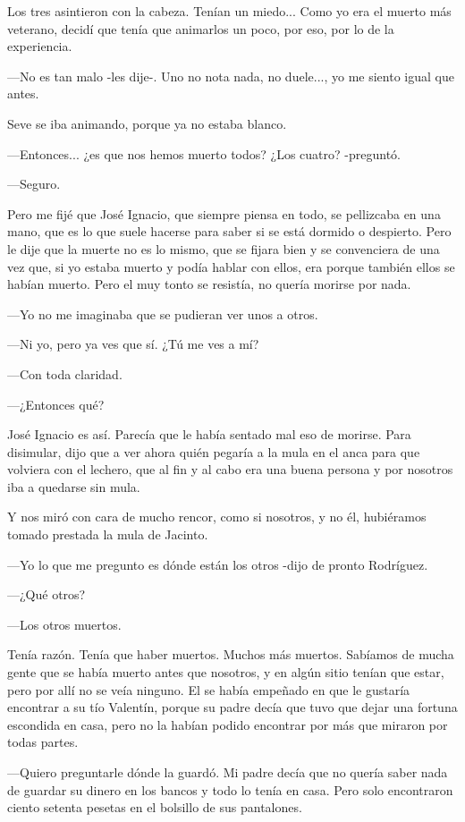 \documentclass{barcodevapor3pags}
\begin{document}
Los tres asintieron con la cabeza. Tenían un miedo... Como yo era el
muerto más veterano, decidí que tenía que animarlos un poco, por eso,
por lo de la experiencia.~

---No es tan malo -les dije-. Uno no nota nada, no duele..., yo me
siento igual que antes.~

Seve se iba animando, porque ya no estaba blanco.~

---Entonces... ¿es que nos hemos muerto todos? ¿Los cuatro? -preguntó.~

---Seguro.~

Pero me fijé que José Ignacio, que siempre piensa en todo, se pellizcaba
en una mano, que es lo que suele hacerse para saber si se está dormido o
despierto. Pero le dije que la muerte no es lo mismo, que se fijara bien
y se convenciera de una vez que, si yo estaba muerto y podía hablar con
ellos, era porque también ellos se habían muerto. Pero el muy tonto se
resistía, no quería morirse por nada.~

---Yo no me imaginaba que se pudieran ver unos a otros.~

---Ni yo, pero ya ves que sí. ¿Tú me ves a mí?~

---Con toda claridad.~

---¿Entonces qué?~

José Ignacio es así. Parecía que le había sentado mal eso de morirse.
Para disimular, dijo que a ver ahora quién pegaría a la mula en el anca
para que volviera con el lechero, que al fin y al cabo era una buena
persona y por nosotros iba a quedarse sin mula.~

Y nos miró con cara de mucho rencor, como si nosotros, y no él,
hubiéramos tomado prestada la mula de Jacinto.~

---Yo lo que me pregunto es dónde están los otros -dijo de pronto
Rodríguez.~

---¿Qué otros?~

---Los otros muertos.~

Tenía razón. Tenía que haber muertos. Muchos más muertos. Sabíamos de
mucha gente que se había muerto antes que nosotros, y en algún sitio
tenían que estar, pero por allí no se veía ninguno. El se había empeñado
en que le gustaría encontrar a su tío Valentín, porque su padre decía
que tuvo que dejar una fortuna escondida en casa, pero no la habían
podido encontrar por más que miraron por todas partes.~

---Quiero preguntarle dónde la guardó. Mi padre decía que no quería
saber nada de guardar su dinero en los bancos y todo lo tenía en casa.
Pero solo encontraron ciento setenta pesetas en el bolsillo de sus
pantalones.~
\end{document}
